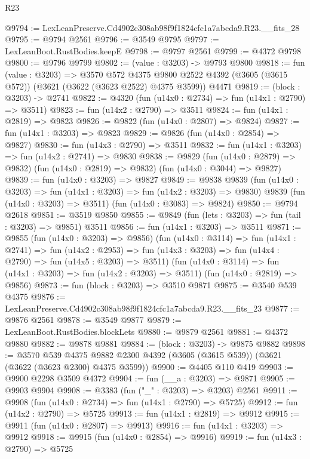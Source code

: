 \begin{lexlean}{R23}
\begin{coremodule}
@9794 := LexLeanPreserve.Cd4902c308ab98f9f1824cfc1a7abcda9.R23.__fits_28
@9795 := @9794 @2561
@9796 := @3549 @9795
@9797 := LexLeanBoot.RustBodies.keepE
@9798 := @9797 @2561
@9799 := @4372 @9798
@9800 := @9796 @9799
@9802 := (value : @3203) -> @9793 @9800
@9818 := fun (value : @3203) =>
  @3570
    @572
    @4375
    @9800
    @2522
    @4392
    (@3605 (@3615 @572))
    (@3621 (@3622 (@3623 @2522) @4375 @3599))
    @4471
@9819 := (block : @3203) -> @2741
@9822 := @4320 (fun (u14x0 : @2734) => fun (u14x1 : @2790) => @3511)
@9823 := fun (u14x2 : @2790) => @3511
@9824 := fun (u14x1 : @2819) => @9823
@9826 := @9822 (fun (u14x0 : @2807) => @9824)
@9827 := fun (u14x1 : @3203) => @9823
@9829 := @9826 (fun (u14x0 : @2854) => @9827)
@9830 := fun (u14x3 : @2790) => @3511
@9832 := fun (u14x1 : @3203) => fun (u14x2 : @2741) => @9830
@9838 := @9829
    (fun (u14x0 : @2879) => @9832)
    (fun (u14x0 : @2819) => @9832)
    (fun (u14x0 : @3044) => @9827)
@9839 := fun (u14x0 : @3203) => @9827
@9849 := @9838
    @9839
    (fun (u14x0 : @3203) => fun (u14x1 : @3203) => fun (u14x2 : @3203) => @9830)
    @9839
    (fun (u14x0 : @3203) => @3511)
    (fun (u14x0 : @3083) => @9824)
@9850 := @9794 @2618
@9851 := @3519 @9850
@9855 := @9849 (fun (lets : @3203) => fun (tail : @3203) => @9851) @3511
@9856 := fun (u14x1 : @3203) => @3511
@9871 := @9855
    (fun (u14x0 : @3203) => @9856)
    (fun (u14x0 : @3114) =>
    fun (u14x1 : @2741) =>
    fun (u14x2 : @2953) =>
    fun (u14x3 : @3203) => fun (u14x4 : @2790) => fun (u14x5 : @3203) => @3511)
    (fun (u14x0 : @3114) => fun (u14x1 : @3203) => fun (u14x2 : @3203) => @3511)
    (fun (u14x0 : @2819) => @9856)
@9873 := fun (block : @3203) => @3510 @9871
@9875 := @3540 @539 @4375
@9876 := LexLeanPreserve.Cd4902c308ab98f9f1824cfc1a7abcda9.R23.__fits_23
@9877 := @9876 @2561
@9878 := @3549 @9877
@9879 := LexLeanBoot.RustBodies.blockLets
@9880 := @9879 @2561
@9881 := @4372 @9880
@9882 := @9878 @9881
@9884 := (block : @3203) -> @9875 @9882
@9898 := @3570
    @539
    @4375
    @9882
    @2300
    @4392
    (@3605 (@3615 @539))
    (@3621 (@3622 (@3623 @2300) @4375 @3599))
@9900 := @4405 @110 @419
@9903 := @9900 @2298 @3509 @4372
@9904 := fun (__a : @3203) => @9871
@9905 := @9903 @9904
@9908 := @3383 (fun ("_" : @3203) => @3203) @2561
@9911 := @9908 (fun (u14x0 : @2734) => fun (u14x1 : @2790) => @5725)
@9912 := fun (u14x2 : @2790) => @5725
@9913 := fun (u14x1 : @2819) => @9912
@9915 := @9911 (fun (u14x0 : @2807) => @9913)
@9916 := fun (u14x1 : @3203) => @9912
@9918 := @9915 (fun (u14x0 : @2854) => @9916)
@9919 := fun (u14x3 : @2790) => @5725

\end{coremodule}
\end{lexlean}
